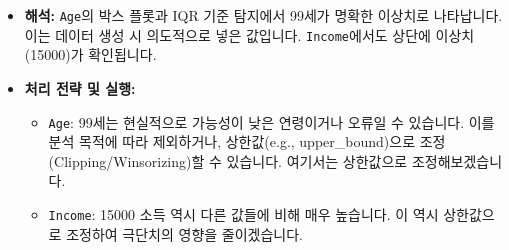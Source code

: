 \documentclass[
  letterpaper,
]{book}
\providecommand{\tightlist}{%
  \setlength{\itemsep}{0pt}\setlength{\parskip}{0pt}}
\begin{document}
\begin{itemize}
\tightlist
\item
  \textbf{해석:} \texttt{Age}의 박스 플롯과 IQR 기준 탐지에서 99세가
  명확한 이상치로 나타납니다. 이는 데이터 생성 시 의도적으로 넣은
  값입니다. \texttt{Income}에서도 상단에 이상치(15000)가 확인됩니다.
\item
  \textbf{처리 전략 및 실행:}

  \begin{itemize}
  \tightlist
  \item
    \texttt{Age}: 99세는 현실적으로 가능성이 낮은 연령이거나 오류일 수
    있습니다. 이를 분석 목적에 따라 제외하거나, 상한값(e.g.,
    upper\_bound)으로 조정(Clipping/Winsorizing)할 수 있습니다. 여기서는
    상한값으로 조정해보겠습니다.
  \item
    \texttt{Income}: 15000 소득 역시 다른 값들에 비해 매우 높습니다. 이
    역시 상한값으로 조정하여 극단치의 영향을 줄이겠습니다.
  \end{itemize}
\end{itemize}
\end{document}
